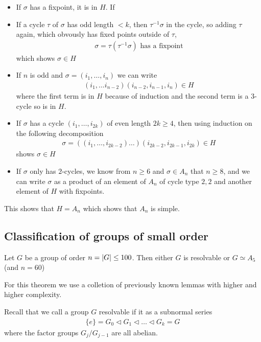 \begin{itemize}
	\item If $\sigma$ has a fixpoint, it is in $H$. If
	\item If a cycle $\tau$ of $\sigma$ has odd length $< k$, then $\tau^{-1} \sigma$ in the cycle, so adding $\tau$ again, which obvously has fixed points outside of $\tau$, 
		\begin{align*}
			\sigma = \tau(\tau^{-1}\sigma) \text{ has a fixpoint}
		\end{align*}
		which shows $\sigma \in H$
	\item If $n$ is odd and $\sigma = (i_1, \ldots, i_n)$ we can write
		\begin{align*}
			(i_1, \ldots i_{n-2}) (i_{n-2},i_{n-1},i_n) \in H
		\end{align*}
		where the first term is in $H$ because of induction and the second term is a $3$-cycle so is in $H$.
	\item If $\sigma$ has a cycle $(i_1, \ldots, i_{2k})$ of even length $2k \geq 4$, then using induction on the following decomposition
		\begin{align*}
			\sigma = \left(
				(i_1, \ldots, i_{2k - 2}) \ldots
			\right) (i_{2k-2}, i_{2k-1}, i_{2k}) \in H
		\end{align*}
		shows $\sigma \in H$
		
	\item If $\sigma$ only has $2$-cycles, we know from $n \geq 6$ and $\sigma \in A_n$ that $n \geq 8$, and we can write $\sigma$ as a product of an element of $A_n$ of cycle type $2,2$ and another element of $H$ with fixpoints.
\end{itemize}

This shows that $H = A_n$ which shows that $A_n$ is simple.

\subsection{Classification of groups of small order}
\begin{theorem}[]
	Let $G$ be a group of order $n = \vert G\vert \leq 100$. Then either $G$ is resolvable or $G \simeq A_5$ (and $n = 60$)
\end{theorem}
For this theorem we use a colletion of previously known lemmas with higher and higher complexity.

Recall that we call a group $G$ resolvable if it as a subnormal series 
\begin{align*}
	\{e\} = G_0 \lhd G_1 \lhd  \ldots \lhd G_k = G	
\end{align*}
where the factor groups $G_j/G_{j-1}$ are all abelian.

